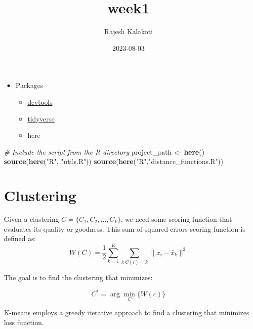 \documentclass[
]{article}
\title{week1}
\author{Rajesh Kalakoti}
\date{2023-08-03}
\newenvironment{Shaded}{\begin{snugshade}}{\end{snugshade}}
\newcommand{\CommentTok}[1]{\textcolor[rgb]{0.56,0.35,0.01}{\textit{#1}}}
\newcommand{\FunctionTok}[1]{\textcolor[rgb]{0.13,0.29,0.53}{\textbf{#1}}}
\newcommand{\NormalTok}[1]{#1}
\newcommand{\OtherTok}[1]{\textcolor[rgb]{0.56,0.35,0.01}{#1}}
\newcommand{\StringTok}[1]{\textcolor[rgb]{0.31,0.60,0.02}{#1}}
\providecommand{\tightlist}{%
  \setlength{\itemsep}{0pt}\setlength{\parskip}{0pt}}
\begin{document}
\maketitle

\begin{itemize}
\tightlist
\item
  Packages

  \begin{itemize}
  \tightlist
  \item
    \href{https://www.r-project.org/nosvn/pandoc/devtools.html}{devtools}
  \item
    \href{https://www.tidyverse.org/packages/}{tidyverse}
  \item
    here
  \end{itemize}
\end{itemize}

\begin{Shaded}
\begin{Highlighting}[]
\CommentTok{\# Include the script from the R directory}
\NormalTok{project\_path }\OtherTok{\textless{}{-}} \FunctionTok{here}\NormalTok{()}
\FunctionTok{source}\NormalTok{(}\FunctionTok{here}\NormalTok{(}\StringTok{"R"}\NormalTok{, }\StringTok{"utils.R"}\NormalTok{))}
\FunctionTok{source}\NormalTok{(}\FunctionTok{here}\NormalTok{(}\StringTok{"R"}\NormalTok{,}\StringTok{"distance\_functions.R"}\NormalTok{))}
\end{Highlighting}
\end{Shaded}

\hypertarget{clustering}{%
\section{Clustering}\label{clustering}}

Given a clustering \(C = \{C_1, C_2, \ldots, C_k\}\), we need some
scoring function that evaluates its quality or goodness. This sum of
squared errors scoring function is defined as:
\[ W(C) = \frac{1}{2} \sum_{k=1}^{K} \sum_{i: C(i)=k} \|x_i - \bar{x}_k\|^2 \]

The goal is to find the clustering that minimizes:

\[ C^* = \arg \min_C \{ W(c) \} \]

K-means employs a greedy iterative approach to find a clustering that
minimizes loss function.
\end{document}
